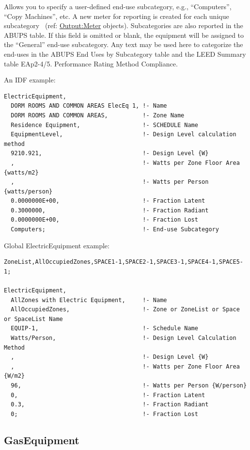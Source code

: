 Allows you to specify a user-defined end-use subcategory, e.g., ``Computers'', ``Copy Machines'', etc. A new meter for reporting is created for each unique subcategory~ (ref: \hyperref[outputmeter-and-outputmetermeterfileonly]{Output:Meter} objects). Subcategories are also reported in the ABUPS table. If this field is omitted or blank, the equipment will be assigned to the ``General'' end-use subcategory. Any text may be used here to categorize the end-uses in the ABUPS End Uses by Subcategory table and the LEED Summary table EAp2-4/5. Performance Rating Method Compliance.


An IDF example:

\begin{lstlisting}
ElectricEquipment,
  DORM ROOMS AND COMMON AREAS ElecEq 1, !- Name
  DORM ROOMS AND COMMON AREAS,          !- Zone Name
  Residence Equipment,                  !- SCHEDULE Name
  EquipmentLevel,                       !- Design Level calculation method
  9210.921,                             !- Design Level {W}
  ,                                     !- Watts per Zone Floor Area {watts/m2}
  ,                                     !- Watts per Person {watts/person}
  0.0000000E+00,                        !- Fraction Latent
  0.3000000,                            !- Fraction Radiant
  0.0000000E+00,                        !- Fraction Lost
  Computers;                            !- End-use Subcategory
\end{lstlisting}

Global ElectricEquipment example:

\begin{lstlisting}
ZoneList,AllOccupiedZones,SPACE1-1,SPACE2-1,SPACE3-1,SPACE4-1,SPACE5-1;

ElectricEquipment,
  AllZones with Electric Equipment,     !- Name
  AllOccupiedZones,                     !- Zone or ZoneList or Space or SpaceList Name
  EQUIP-1,                              !- Schedule Name
  Watts/Person,                         !- Design Level Calculation Method
  ,                                     !- Design Level {W}
  ,                                     !- Watts per Zone Floor Area {W/m2}
  96,                                   !- Watts per Person {W/person}
  0,                                    !- Fraction Latent
  0.3,                                  !- Fraction Radiant
  0;                                    !- Fraction Lost
\end{lstlisting}

\subsection{GasEquipment}\label{gasequipment}

